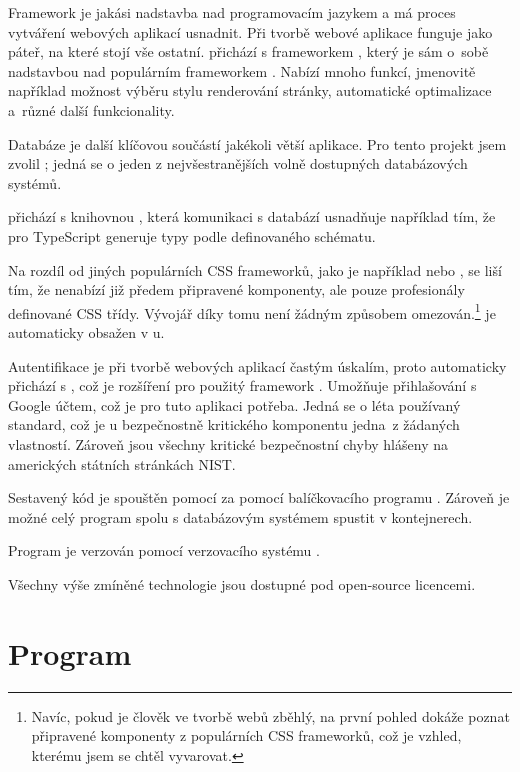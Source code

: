 Framework je jakási nadstavba nad programovacím jazykem a má proces vytváření webových aplikací usnadnit. Při tvorbě webové aplikace funguje jako páteř, na které stojí vše ostatní.  přichází s frameworkem , který je sám o~sobě nadstavbou nad populárním frameworkem . Nabízí mnoho funkcí, jmenovitě například možnost výběru stylu renderování stránky, automatické optimalizace a~různé další funkcionality.\cite{nextjs}


Databáze je další klíčovou součástí jakékoli větší aplikace. Pro tento projekt jsem zvolil ; jedná se o jeden z nejvšestranějších volně dostupných databázových systémů.

 přichází s knihovnou , která komunikaci s databází usnadňuje například tím, že pro TypeScript generuje typy podle definovaného schématu.

Na rozdíl od jiných populárních CSS frameworků, jako je například  nebo , se  liší tím, že nenabízí již předem připravené komponenty, ale pouze profesionály definované CSS třídy. Vývojář díky tomu není žádným způsobem omezován.\footnote{Navíc, pokud je člověk ve tvorbě webů zběhlý, na první pohled dokáže poznat připravené komponenty z populárních CSS  frameworků, což je vzhled, kterému jsem se chtěl vyvarovat.}\cite{tailwind}  je automaticky obsažen v u.

Autentifikace je při tvorbě webových aplikací častým úskalím, proto  automaticky přichází s , což je rozšíření pro použitý framework . Umožňuje přihlašování s Google účtem, což je pro tuto aplikaci potřeba. Jedná se o léta používaný standard, což je u bezpečnostně kritického komponentu jedna~z žádaných vlastností. Zároveň jsou všechny kritické bezpečnostní chyby hlášeny na amerických státních stránkách NIST.

Sestavený kód je spouštěn pomocí  za pomocí balíčkovacího programu . Zároveň je možné celý program spolu s databázovým systémem spustit v  kontejnerech.

Program je verzován pomocí verzovacího systému .

Všechny výše zmíněné technologie jsou dostupné pod open-source licencemi.

\section{Program}

